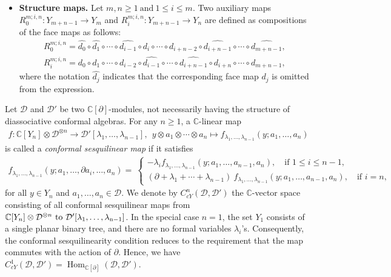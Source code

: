 \documentclass[a4paper,reqno,10pt]{amsart}
\theoremstyle{plain}
\theoremstyle{definition}
\theoremstyle{remark}
\newcommand{\C}{\mathbb{C}}
\newcommand{\D}{\mathcal{D}}
\newcommand{\p}{\partial}
\newcommand{\la}{\lambda}
\begin{document}
\begin{itemize}
\item[(iv)] {\bf Structure maps.} Let $m,n \geq 1 \mathrm{~and~}1\leq i \leq m $. Two auxiliary maps $R_{0}^{m; i,n}: Y_{m+n-1} \rightarrow Y_{m}$ and $R_{i}^{m;i,n}: Y_{m+n-1} \to Y_{n}$ are defined as compositions of the face maps as follows:
\begin{align*}
R_0^{m; i, n}  = \widehat{d_0} \circ \widehat{d_1} \circ \cdots \circ \widehat{d_{i-1}} \circ d_i \circ \cdots \circ d_{i+n-2} \circ \widehat{d_{i + n-1}} \circ \cdots \circ \widehat{d_{m+n-1}},\\
R_i^{m; i, n}  = d_0 \circ d_1 \circ \cdots \circ d_{i-2} \circ \widehat{d_{i-1}} \circ \cdots \circ \widehat{d_{i+n-1}} \circ d_{i+n} \circ \cdots \circ d_{m+n-1},
\end{align*}
where the notation $\widehat{d_j}$ indicates that the corresponding face map $d_j$ is omitted from the expression.
\end{itemize}

\medskip

Let $\D$ and $\mathcal{D'}$ be two $\C[\p]$-modules, not necessarily having the structure of diassociative conformal algebras. For any $n \geq 1$, a $\C$-linear map 
\begin{align*}
f : \C[Y_n]\otimes \mathcal{ D}^{\otimes n} \rightarrow \mathcal{ D'}[\la_1,\ldots , \la _{n-1}],~ ~y\otimes a_1 \otimes \cdots \otimes a_n \mapsto f_{\la_1 , \ldots , \la _{n-1}}(y;a_1 , \ldots , a _n)
\end{align*}
is called a {\em conformal sesquilinear map} if it satisfies 
\begin{align*}
     f_{\la_1 , \ldots , \la _{n-1}}(y;a_1 , \ldots , \p a_i , \ldots, a _n) =~
     \begin{cases}
        -\la_i f_{\la_1 , \ldots , \la _{n-1}}(y;a_1 , \ldots ,a_{n-1}, a _n), \quad \text{if } 1\leq i \leq n-1, \\
         (\p + \la_1 + \cdots + \la_{n-1}) ~ \! f_{\la_1 , \ldots , \la _{n-1}}(y;a_1 , \ldots , a_{n-1}, a _n), \quad \text{if } i=n,
     \end{cases}
 \end{align*}
   for all $y \in Y_n$ and $a_1, \ldots , a_n \in \D$. We denote by $ C_{cY}^{n}(\D,\mathcal{D'})$ the $\C$-vector space consisting of all conformal sesquilinear maps from $\C[Y_n]\otimes \D^{\otimes n} \rm{~to~} \mathcal{D'}[\la _1 , \ldots , \la_{n-1}]$. In the special case $n=1$, the set $Y_{1}$ consists of a single planar binary tree, and there are no formal variables $\la_{i}$'s. Consequently, the conformal sesquilinearity condition reduces to the requirement that the map commutes with the action of $\p$. Hence, we have
$C_{cY}^{1}(\D,\D')
=\operatorname{Hom}_{\C[\p]}(\D,\D').$
\end{document}
